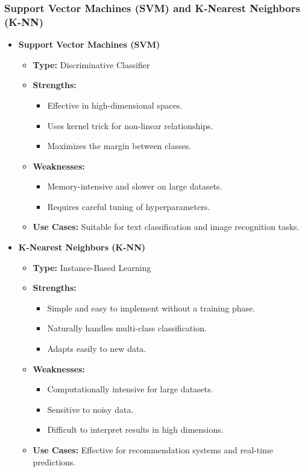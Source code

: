 \documentclass[aspectratio=169]{beamer}
\begin{document}
\begin{frame}[fragile]
    \frametitle{Support Vector Machines (SVM) and K-Nearest Neighbors (K-NN)}
    \begin{itemize}
        \item \textbf{Support Vector Machines (SVM)}
        \begin{itemize}
            \item \textbf{Type:} Discriminative Classifier
            \item \textbf{Strengths:}
                \begin{itemize}
                    \item Effective in high-dimensional spaces.
                    \item Uses kernel trick for non-linear relationships.
                    \item Maximizes the margin between classes.
                \end{itemize}
            \item \textbf{Weaknesses:}
                \begin{itemize}
                    \item Memory-intensive and slower on large datasets.
                    \item Requires careful tuning of hyperparameters.
                \end{itemize}
            \item \textbf{Use Cases:} Suitable for text classification and image recognition tasks.
        \end{itemize}
        
        \item \textbf{K-Nearest Neighbors (K-NN)}
        \begin{itemize}
            \item \textbf{Type:} Instance-Based Learning
            \item \textbf{Strengths:}
                \begin{itemize}
                    \item Simple and easy to implement without a training phase.
                    \item Naturally handles multi-class classification.
                    \item Adapts easily to new data.
                \end{itemize}
            \item \textbf{Weaknesses:}
                \begin{itemize}
                    \item Computationally intensive for large datasets.
                    \item Sensitive to noisy data.
                    \item Difficult to interpret results in high dimensions.
                \end{itemize}
            \item \textbf{Use Cases:} Effective for recommendation systems and real-time predictions.
        \end{itemize}
    \end{itemize}
\end{frame}
\end{document}
